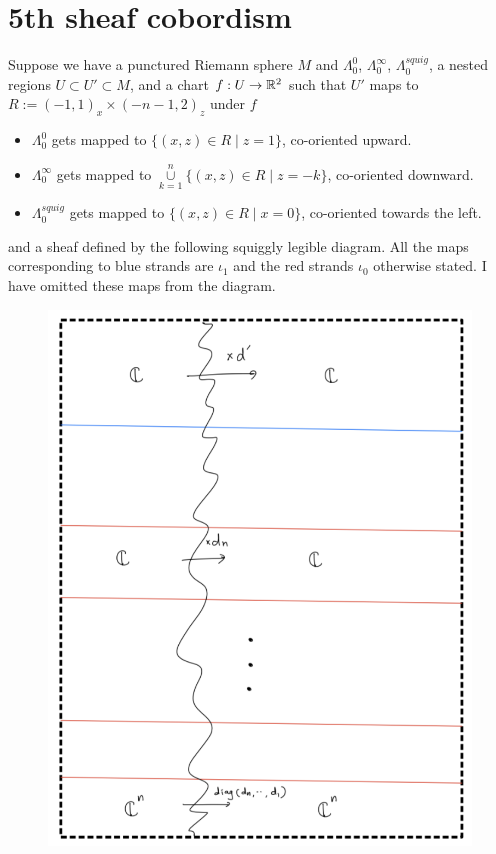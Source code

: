 \section{5th sheaf cobordism}
Suppose we have a punctured Riemann sphere $M$ and $\Lambda_0^0$, $\Lambda_0^\infty$, $\Lambda_0^{squig}$, a nested regions $U\subset U' \subset M$, and a chart $f : U \rightarrow \mathbb{R}^2$ such that $U'$ maps to $R:=(-1,1)_x \times (-n-1,2)_z$ under $f$
\begin{itemize}
\item $\Lambda_0^0$ gets mapped to $\{(x,z)\in R \mid z=1\}$, co-oriented upward.

\item $\Lambda_0^\infty$ gets mapped to $\overset{n}{\underset{k=1}{\cup}}\{(x,z)\in R \mid z=-k\}$, co-oriented downward.

\item $\Lambda_0^{squig}$ gets mapped to $\{(x,z)\in R \mid x=0\}$, co-oriented towards the left.
\end{itemize}
and a sheaf defined by the following squiggly legible diagram. All the maps corresponding to blue strands are $\iota_1$ and the red strands $\iota_0$ otherwise stated. I have omitted these maps from the diagram.\\
\begin{figure}[H]
    \centering
    \includegraphics[scale = 0.95]{diagrams/cobord5/1.png} 
    \caption{}
    \label{fig:your-label}
\end{figure}

